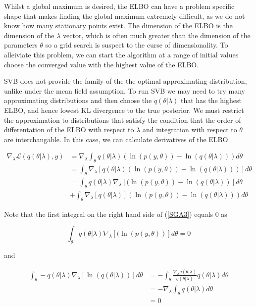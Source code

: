 \documentclass{article}\usepackage[]{graphicx}\usepackage[]{color}
\numberwithin{equation}{section}
\begin{document}
Whilst a global maximum is desired, the ELBO can have a problem specific shape that makes finding the global maximum extremely difficult, as we do not know how many stationary points exist. The dimension of the ELBO is the dimension of the $\lambda$ vector, which is often much greater than the dimension of the parameters $\theta$ so a grid search is suspect to the curse of dimensionality. To alleiviate this problem, we can start the algorithm at a range of initial values choose the converged value with the highest value of the ELBO. 

SVB does not provide the family of the the optimal approximating distribution, unlike under the mean field assumption. To run SVB we may need to try many approximating distributions and then choose the $q(\theta | \lambda)$ that has the highest ELBO, and hence lowest KL divergence to the true posterior. We must restrict the approximation to distributions that satisfy the condition that the order of differentation of the ELBO with respect to $\lambda$ and integration with respect to $\theta$ are interchangable. In this case, we can calculate derivatives of the ELBO.

\begin{align}
\nabla_{\lambda} \mathcal{L}(q(\theta | \lambda), y) &=  \nabla_{\lambda} \int_{\theta} q(\theta | \lambda) \left( \ln (p(y, \theta)) - \ln(q(\theta | \lambda)) \right) d\theta \nonumber \\
&=   \int_{\theta} \nabla_{\lambda}[  q(\theta | \lambda) \left( \ln (p(y, \theta)) - \ln(q(\theta | \lambda)) \right)] d\theta \label{SGA2} \\
&=  \int_{\theta}  q(\theta | \lambda) \nabla_{\lambda}[( \ln (p(y, \theta)) - \ln(q(\theta | \lambda))] d\theta \nonumber \\ 
&+ \int_{\theta} \nabla_{\lambda} [q(\theta | \lambda)] \left( \ln (p(y, \theta)) - \ln(q(\theta | \lambda)) \right) d\theta \label{SGA3}
\end{align}

Note that the first integral on the right hand side of (\ref{SGA3}) equals 0 as

\begin{equation}
\int_{\theta}  q(\theta | \lambda) \nabla_{\lambda}[( \ln (p(y, \theta))] d\theta = 0
\end{equation}

and

\begin{align}
\int_{\theta} - q(\theta | \lambda) \nabla_{\lambda}[ \ln(q(\theta | \lambda))] d\theta &= - \int_{\theta} \frac{\nabla_{\lambda}q(\theta | \lambda)}{q(\theta | \lambda)} q(\theta | \lambda) d\theta \nonumber \\
&=  -  \nabla_{\lambda}\int_{\theta} q(\theta | \lambda) d\theta \nonumber \\
&=  0 \nonumber
\end{align}
\end{document}
